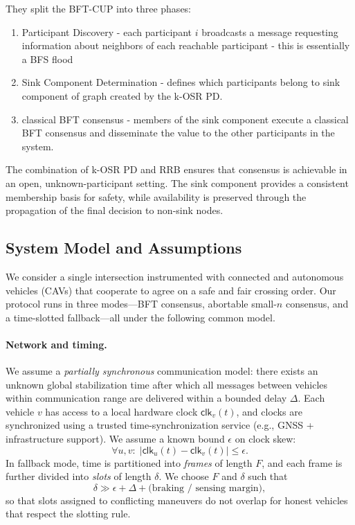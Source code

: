 \documentclass[fleqn,10pt]{olplainarticle}
\begin{document}
They split the BFT-CUP into three phases:

\begin{enumerate}
    \item Participant Discovery - each participant $i$ broadcasts a message requesting information about neighbors of each reachable participant - this is essentially a BFS flood 
    
    \item Sink Component Determination - defines which participants belong to sink component of graph created by the k-OSR PD. 
    \item classical BFT consensus - members of the sink component execute a classical BFT consensus and disseminate the value to the other participants in the system. 
    
\end{enumerate}

The combination of k-OSR PD and RRB ensures that consensus is achievable in an open, unknown-participant setting. The sink component provides a consistent membership basis for safety, while availability is preserved through the propagation of the final decision to non-sink nodes.




\subsection{System Model and Assumptions}
\label{subsec:system-model}

We consider a single intersection instrumented with connected and autonomous vehicles (CAVs) that cooperate to agree on a safe and fair crossing order. Our protocol runs in three modes---BFT consensus, abortable small-$n$ consensus, and a time-slotted fallback---all under the following common model.

\paragraph{Network and timing.}
We assume a \emph{partially synchronous} communication model: there exists an unknown global stabilization time after which all messages between vehicles within communication range are delivered within a bounded delay $\Delta$. Each vehicle $v$ has access to a local hardware clock $\mathsf{clk}_v(t)$, and clocks are synchronized using a trusted time-synchronization service (e.g., GNSS + infrastructure support). We assume a known bound $\epsilon$ on clock skew:
\[
  \forall u,v:\;\bigl|\mathsf{clk}_u(t) - \mathsf{clk}_v(t)\bigr| \le \epsilon.
\]
In fallback mode, time is partitioned into \emph{frames} of length $F$, and each frame is further divided into \emph{slots} of length $\delta$. We choose $F$ and $\delta$ such that
\[
  \delta \gg \epsilon + \Delta + \text{(braking / sensing margin)},
\]
so that slots assigned to conflicting maneuvers do not overlap for honest vehicles that respect the slotting rule.
\end{document}
